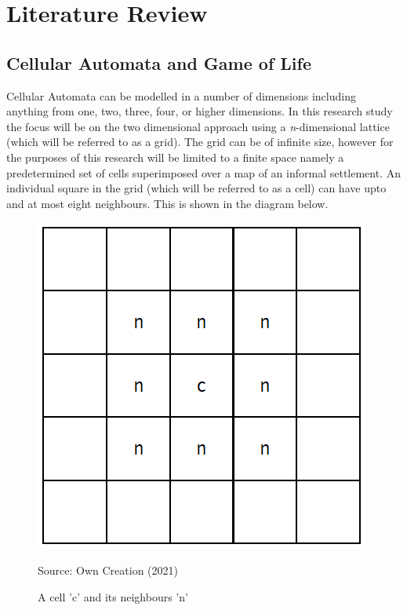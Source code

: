 
\chapter{Literature Review} %

\label{Chapter2} %




\section{Cellular Automata and Game of Life}
\label{sec:LitCA}
Cellular Automata can be modelled in a number of dimensions including anything from one, two, three, four, or higher dimensions\citep{adamatzky2010game}. In this research study the focus will be on the two dimensional approach using a \textsl{n}-dimensional lattice (which will be referred to as a grid). The grid can be of infinite size, however for the purposes of this research will be limited to a finite space namely a predetermined set of cells superimposed over a map of an informal settlement. An individual square in the grid (which will be referred to as a cell) can have upto and at most eight neighbours. This is shown in the diagram below.
\begin{figure}[H]
\centering
\includegraphics[scale=0.4]{Figures/Chapter2/cell.png}
\caption{A cell 'c' and its neighbours 'n'}
\label{fig:cell}
\begin{center}
Source: Own Creation (2021)
\end{center}
\end{figure}
